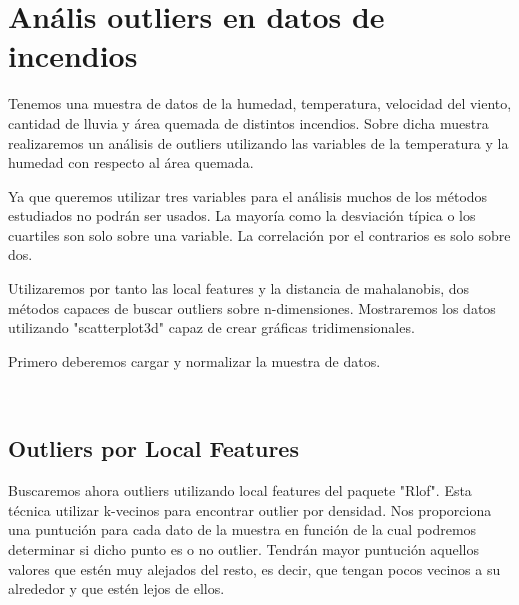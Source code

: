 \documentclass [a4paper] {article}
\begin{document}
\newpage
\section{Anális outliers en datos de incendios}
Tenemos una muestra de datos de la humedad, temperatura, velocidad del viento, cantidad de lluvia y área quemada de distintos incendios.
Sobre dicha muestra realizaremos un análisis de outliers utilizando las variables de la temperatura y la humedad con respecto al área quemada.

Ya que queremos utilizar tres variables para el análisis muchos de los métodos estudiados no podrán ser usados.
La mayoría como la desviación típica o los cuartiles son solo sobre una variable. La correlación por el contrarios es solo sobre dos.

Utilizaremos por tanto las local features y la distancia de mahalanobis, dos métodos capaces de buscar outliers sobre n-dimensiones.
Mostraremos los datos utilizando "scatterplot3d" capaz de crear gráficas tridimensionales.

Primero deberemos cargar y normalizar la muestra de datos.
\begin{center}
\begin{Schunk}
\end{Schunk}
\includegraphics{entrega-forest_fires_data}
\end{center}

\subsection{Outliers por Local Features}
Buscaremos ahora outliers utilizando local features del paquete "Rlof".
Esta técnica utilizar k-vecinos para encontrar outlier por densidad.
Nos proporciona una puntución para cada dato de la muestra en función de la cual podremos determinar si dicho punto es o no outlier.
Tendrán mayor puntución aquellos valores que estén muy alejados del resto, es decir, que tengan pocos vecinos a su alrededor y que estén lejos de ellos.
\end{document}
